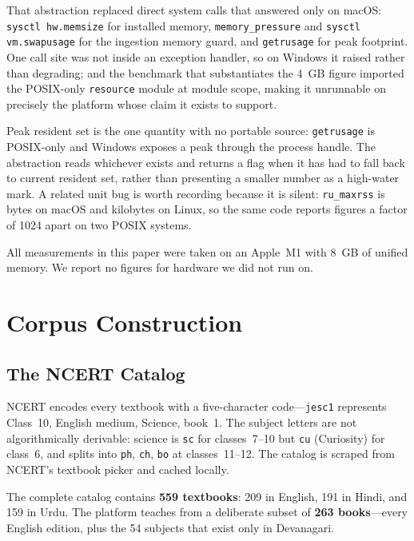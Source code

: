 \documentclass[conference]{IEEEtran}
\begin{document}
That abstraction replaced direct system calls that answered only on macOS: \texttt{sysctl hw.memsize} for installed memory, \texttt{memory\_pressure} and \texttt{sysctl vm.swapusage} for the ingestion memory guard, and \texttt{getrusage} for peak footprint. One call site was not inside an exception handler, so on Windows it raised rather than degrading; and the benchmark that substantiates the 4~GB figure imported the POSIX-only \texttt{resource} module at module scope, making it unrunnable on precisely the platform whose claim it exists to support.

Peak resident set is the one quantity with no portable source: \texttt{getrusage} is POSIX-only and Windows exposes a peak through the process handle. The abstraction reads whichever exists and returns a flag when it has had to fall back to current resident set, rather than presenting a smaller number as a high-water mark. A related unit bug is worth recording because it is silent: \texttt{ru\_maxrss} is bytes on macOS and kilobytes on Linux, so the same code reports figures a factor of 1024 apart on two POSIX systems.

All measurements in this paper were taken on an Apple~M1 with 8~GB of unified memory. We report no figures for hardware we did not run on.

\section{Corpus Construction}

\subsection{The NCERT Catalog}
NCERT encodes every textbook with a five-character code---\texttt{jesc1} represents Class~10, English medium, Science, book~1. The subject letters are not algorithmically derivable: science is \texttt{sc} for classes~7--10 but \texttt{cu} (Curiosity) for class~6, and splits into \texttt{ph}, \texttt{ch}, \texttt{bo} at classes~11--12. The catalog is scraped from NCERT's textbook picker and cached locally.

The complete catalog contains \textbf{559 textbooks}: 209 in English, 191 in Hindi, and 159 in Urdu. The platform teaches from a deliberate subset of \textbf{263 books}---every English edition, plus the 54 subjects that exist only in Devanagari.
\end{document}
